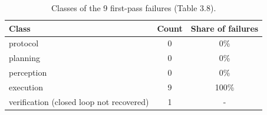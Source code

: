 \begin{table}[htbp]
\centering
\caption{Classes of the 9 first-pass failures (Table 3.8).}
\label{tab:rdt_attribution}
\small
\begin{tabular}{lcc}
\toprule
Class & Count & Share of failures \\
\midrule
protocol & 0 & 0\% \\
planning & 0 & 0\% \\
perception & 0 & 0\% \\
execution & 9 & 100\% \\
verification (closed loop not recovered) & 1 & - \\
\bottomrule
\end{tabular}
\end{table}
